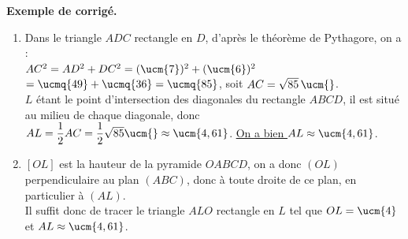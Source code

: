 \begin{activite}
   \textcolor{G1}{
   {\bf Exemple de corrigé.} \smallskip
      \begin{enumerate}
         \item Dans le triangle $ADC$ rectangle en $D$, d'après le théorème de Pythagore, on a : \\ [1mm]
            $AC^2 =AD^2+DC^2 =(\ucm{7})^2+(\ucm{6})^2$ \\
            \hspace*{2.85cm} $=\ucmq{49}+\ucmq{36} =\ucmq{85}$, soit $AC =\sqrt{85}\,\ucm{}$. \\
            $L$ étant le point d'intersection des diagonales du rectangle $ABCD$, il est situé au milieu de chaque diagonale, donc $AL =\dfrac12AC =\dfrac12\sqrt{85}\ucm{} \approx\ucm{4,61}$. \uline{On a bien $AL \approx\ucm{4,61}$}. \smallskip
         \item $[OL]$ est la hauteur de la pyramide $OABCD$, on a donc $(OL)$ perpendiculaire au plan $(ABC)$, donc à toute droite de ce plan, en particulier à $(AL)$. \\
            Il suffit donc de tracer le triangle $ALO$ rectangle en $L$ tel que $OL =\ucm{4}$ et $AL \approx\ucm{4,61}$.
      \end{enumerate}}
\end{activite}

\pagebreak


